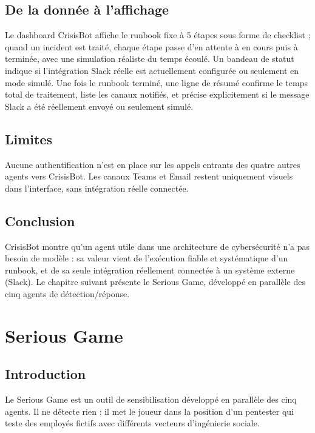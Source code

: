\documentclass[12pt,a4paper]{report}
\begin{document}
\section{De la donnée à l'affichage}

Le dashboard CrisisBot affiche le runbook fixe à 5 étapes sous forme de checklist ; quand un incident est traité, chaque étape passe d'en attente à en cours puis à terminée, avec une simulation réaliste du temps écoulé. Un bandeau de statut indique si l'intégration Slack réelle est actuellement configurée ou seulement en mode simulé. Une fois le runbook terminé, une ligne de résumé confirme le temps total de traitement, liste les canaux notifiés, et précise explicitement si le message Slack a été réellement envoyé ou seulement simulé.

\section{Limites}

Aucune authentification n'est en place sur les appels entrants des quatre autres agents vers CrisisBot. Les canaux Teams et Email restent uniquement visuels dans l'interface, sans intégration réelle connectée.

\section{Conclusion}

CrisisBot montre qu'un agent utile dans une architecture de cybersécurité n'a pas besoin de modèle : sa valeur vient de l'exécution fiable et systématique d'un runbook, et de sa seule intégration réellement connectée à un système externe (Slack). Le chapitre suivant présente le Serious Game, développé en parallèle des cinq agents de détection/réponse.

\chapter{Serious Game}

\section{Introduction}

Le Serious Game est un outil de sensibilisation développé en parallèle des cinq agents. Il ne détecte rien : il met le joueur dans la position d'un pentester qui teste des employés fictifs avec différents vecteurs d'ingénierie sociale.
\end{document}
